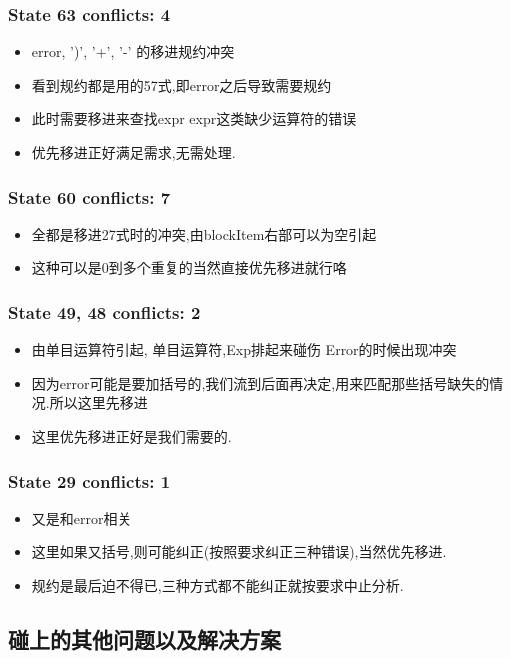 \documentclass[11pt]{article}
\begin{document}
\subsubsection{State 63 conflicts: 4}
\label{sec-2-2-5}
\begin{itemize}
\item error, ')', '+', '-' 的移进规约冲突
\item 看到规约都是用的57式,即error之后导致需要规约
\item 此时需要移进来查找expr expr这类缺少运算符的错误
\item 优先移进正好满足需求,无需处理.
\end{itemize}
\subsubsection{State 60 conflicts: 7}
\label{sec-2-2-6}
\begin{itemize}
\item 全都是移进27式时的冲突,由blockItem右部可以为空引起
\item 这种可以是0到多个重复的当然直接优先移进就行咯
\end{itemize}
\subsubsection{State 49, 48 conflicts: 2}
\label{sec-2-2-7}
\begin{itemize}
\item 由单目运算符引起, 单目运算符,Exp排起来碰伤 Error的时候出现冲突
\item 因为error可能是要加括号的,我们流到后面再决定,用来匹配那些括号缺失的情况.所以这里先移进
\item 这里优先移进正好是我们需要的.
\end{itemize}
\subsubsection{State 29 conflicts: 1}
\label{sec-2-2-8}
\begin{itemize}
\item 又是和error相关
\item 这里如果又括号,则可能纠正(按照要求纠正三种错误),当然优先移进.
\item 规约是最后迫不得已,三种方式都不能纠正就按要求中止分析.
\end{itemize}

\subsection{碰上的其他问题以及解决方案}
\label{sec-2-3}
\end{document}
